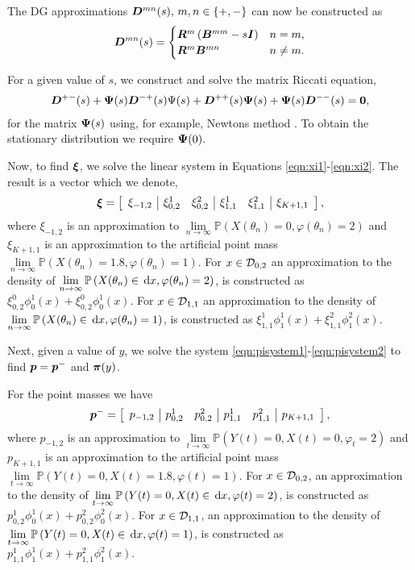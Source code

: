 The DG approximations \(  \boldsymbol D^{m n}(s),\, m,n\in\{+,-\}\) can now be constructed as 
\[  \boldsymbol D^{m n}(s) = \begin{cases}   \boldsymbol R^m\left({  \boldsymbol B}^{mm} - s \boldsymbol I\right) & n=m,
	\\   \boldsymbol R^m {  \boldsymbol B}^{mn} & n \neq m. \end{cases}\]

For a given value of \(s\), we construct and solve the matrix Riccati equation,
\begin{align*}
	\boldsymbol D^{+-}(s)
+ \boldsymbol \Psi(s)   \boldsymbol D^{-+}(s)\Psi(s)
+   \boldsymbol D^{++}(s)\boldsymbol \Psi(s)
+ \boldsymbol \Psi(s)  \boldsymbol D^{--}(s)
= \boldsymbol 0,
\end{align*}
for the matrix \(\boldsymbol \Psi(s)\) using, for example, Newtons method \citep{bot08}. To obtain the stationary distribution we require \(\boldsymbol \Psi(0)\). 

Now, to find \( {\boldsymbol\xi}\), we solve the linear system in Equations \eqref{eqn:xi1}-\eqref{eqn:xi2}. The result is a vector which we denote, 
\[ {\boldsymbol\xi} = \left[\begin{array}{c|cc|cc|c} {\xi}_{-1,2} &  {\xi}_{0,2}^1 &  {\xi}_{0,2}^2 &  {\xi}_{1,1}^1 &  {\xi}_{1,1}^2 &  {\xi}_{K+1,1} \end{array}\right],\]
where \( {\xi}_{-1,2}\) is an approximation to \( \lim\limits_{n\to\infty}\mathbb{P}\left( X{(\theta_n)} =0, \varphi({\theta_n}) = 2\right)\) and \( {\xi}_{K+1,1}\) is an approximation to the artificial point mass \( \lim\limits_{n\to\infty}\mathbb{P}\left( X({\theta_n}) =1.8, \varphi({\theta_n}) = 1\right)\). For \(x\in\mathcal{D}_{0,2}\) an approximation to the density of \( \lim\limits_{n\to\infty}\mathbb{P}\left( X({\theta_n}) \in \, \mathrm{d} x, \varphi({\theta_n}) = 2\right)\), is constructed as \( {\xi}_{0,2}^0\phi_0^1(x) +  {\xi}_{0,2}^0\phi_0^1(x)\). For \(x\in\mathcal{D}_{1,1}\) an approximation to the density of \( \lim\limits_{n\to\infty}\mathbb{P}\left(X({\theta_n}) \in \, \mathrm{d} x, \varphi({\theta_n}) = 1\right)\), is constructed as \( {\xi}_{1,1}^1\phi_1^1(x) +  {\xi}_{1,1}^2\phi_1^2(x).\)

Next, given a value of \(y\), we solve the system \eqref{eqn:pisystem1}-\eqref{eqn:pisystem2} to find \( {\boldsymbol p}= {\boldsymbol p}^-\) and \( {\boldsymbol \pi}(y)\). 

For the point masses we have 
\[ {\boldsymbol p}^- = \left[\begin{array}{c|cc|cc|c} {p}_{-1,2} &  {p}_{0,2}^1 &  {p}_{0,2}^2 &  {p}_{1,1}^1 &  {p}_{1,1}^2 &  {p}_{K+1,1} \end{array}\right],\]
where \( {p}_{-1,2}\) is an approximation to \( \lim\limits_{t\to\infty}\mathbb{P}\left(Y(t)=0,X({t}) =0, \varphi_{t} = 2\right)\) and \( {p}_{K+1,1}\) is an approximation to the artificial point mass \( \lim\limits_{t\to\infty}\mathbb{P}\left(Y(t)=0, X(t) =1.8, \varphi({t}) = 1\right)\). For \(x\in\mathcal{D}_{0,2}\), an approximation to the density of \( \lim\limits_{t\to\infty}\mathbb{P}\left( Y(t)=0, X(t) \in \, \mathrm{d} x, \varphi({t}) = 2\right)\), is constructed as \( {p}_{0,2}^1\phi_0^1(x) +  {p}_{0,2}^2\phi_0^2(x)\). For \(x\in\mathcal{D}_{1,1}\), an approximation to the density of \( \lim\limits_{t\to\infty}\mathbb{P}\left(Y(t)=0, X(t) \in \, \mathrm{d} x, \varphi({t}) = 1\right)\), is constructed as \( {p}_{1,1}^1\phi_1^1(x) +  {p}_{1,1}^2\phi_1^2(x).\)

